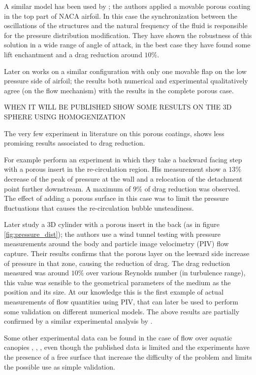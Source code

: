 A similar model has been used by \citet{venkataraman2012numerical}; the authors applied a movable porous coating in the top part of NACA airfoil.
In this case the synchronization between the oscillations of the structures and the natural frequency of the fluid is responsible for the pressure distribution modification.
They have shown the robustness of this solution in a wide range of angle of attack, in the best case they have found some lift enchantment and a drag reduction around $10\%$.

Later on \citet{rosti2017pelskin} works on a similar configuration with only one movable flap on the low pressure side of airfoil; the results both numerical and experimental qualitatively agree (on the flow mechanism) with the results in the complete porous case.

WHEN IT WILL BE PUBLISHED SHOW SOME RESULTS ON THE 3D SPHERE USING HOMOGENIZATION \citet{zampogna2017new}

The very few experiment in literature on this porous coatings, shows less promising results associated to drag reduction.

For example \citet{heenan1998passive} perform an experiment in which they take a backward facing step with a porous insert in the re-circulation region.
His measurement show a $13\%$ decrease of the peak of pressure at the wall and a relocation of the detachment point further downstream.
A maximum of $9\%$ of drag reduction was observed.
The effect of adding a porous surface in this case was to limit the pressure fluctuations that causes the re-circulation bubble unsteadiness.

Later \citet{klausmann2017drag} study a 3D cylinder with a porous insert in the back (as in figure \ref{fig:pressure_dist}); the authors use a wind tunnel testing with pressure measurements around the body and particle image velocimetry (PIV) flow capture.
Their results confirms that the porous layer on the leeward side increase of pressure in that zone, causing the reduction of drag.
The drag reduction measured was around $10\%$ over various Reynolds number (in turbulence range), this value was sensible to the geometrical parameters of the medium as the position and its size.
At our knowledge this is the first example of actual measurements of flow quantities using PIV, that can later be used to perform some validation on different numerical models.
The above results are partially confirmed by a similar experimental analysis by \citet{grizzetti2015esperimenti}.

Some other experimental data can be found in the case of flow over aquatic canopies \citet{zhang2011exchange}, \citet{segalini2011experimental}, \citet{hamed2017impact}, even though the published data is limited and the experiments have the presence of a free surface that increase the difficulty of the problem and limits the possible use as simple validation.

